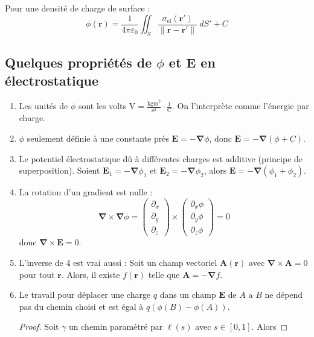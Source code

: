Pour une densité de charge de surface :
$$
\phi (\boldsymbol{r})=\frac{1}{4\pi\varepsilon_{0}}\iint _{S} \frac{\sigma _{\mathrm{el}}(\boldsymbol{r}')}{\lVert \boldsymbol{r}-\boldsymbol{r}' \rVert }~dS'+C
$$

\subsection{Quelques propriétés de \texorpdfstring{$\phi$ et $\boldsymbol{E}$}{le potentiel électrostatique et le champ} en électrostatique}\label{ch551}
\begin{enumerate}
\item Les unités de $\phi$ sont les volts $\mathrm{V}=\frac{\mathrm{kgm}^{2}}{\mathrm{s}^{2}}\cdot \frac{1}{\mathrm{C}}$. On l'interprète comme l'énergie par charge.
\item $\phi$ seulement définie à une constante près $\boldsymbol{E}=-\boldsymbol{\nabla}\phi$, donc $\boldsymbol{E}=-\boldsymbol{\nabla}(\phi +C)$.
\item Le potentiel électrostatique dû à différentes charges est additive (principe de superposition). Soient $\boldsymbol{E}_{1}=-\boldsymbol{\nabla}\phi_{1}$ et $\boldsymbol{E}_{2}=-\boldsymbol{\nabla}\phi_{2}$, alors $\boldsymbol{E}=-\boldsymbol{\nabla}(\phi_{1} +\phi_{2})$.
\item La rotation d'un gradient est nulle : 
$$
\boldsymbol{\nabla}\times \boldsymbol{\nabla}\phi=\begin{pmatrix}
\partial _{x} \\
\partial _{y} \\
\partial _{z}
\end{pmatrix}\times \begin{pmatrix}
\partial _{x}\phi \\
\partial _{y}\phi \\
\partial _{z}\phi 
\end{pmatrix}=0
$$
donc $\boldsymbol{\nabla}\times \boldsymbol{E}=0$.
\item L'inverse de 4 est vrai aussi : Soit un champ vectoriel $\boldsymbol{A}(\boldsymbol{r})$ avec $\boldsymbol{\nabla}\times \boldsymbol{A}=0$ pour tout $\boldsymbol{r}$. Alors, il existe $f(\boldsymbol{r})$ telle que $\boldsymbol{A}=-\boldsymbol{\nabla}f$.
\item Le travail pour déplacer une charge $q$ dans un champ $\boldsymbol{E}$ de $A$ a $B$ ne dépend pas du chemin choisi et est égal à $q(\phi(B)-\phi(A))$.
\begin{proof}
Soit $\gamma$ un chemin paramétré par $\boldsymbol{\ell}(s)$ avec $s \in[0,1]$. Alors 

\end{proof}
\end{enumerate}
